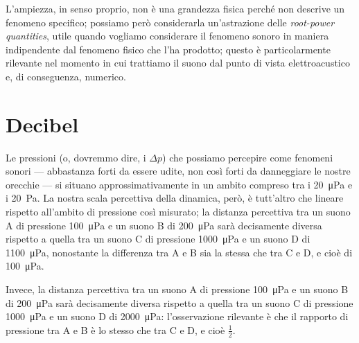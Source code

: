 \documentclass[11pt]{report}
\begin{document}
L'ampiezza, in senso proprio, non è una grandezza fisica perché non descrive un fenomeno specifico; possiamo però considerarla un'astrazione delle \emph{root-power quantities}, utile quando vogliamo considerare il fenomeno sonoro in maniera indipendente dal fenomeno fisico che l'ha prodotto; questo è particolarmente rilevante nel momento in cui trattiamo il suono dal punto di vista elettroacustico e, di conseguenza, numerico.



\section{Decibel}

Le pressioni (o, dovremmo dire, i $\Delta p$) che possiamo percepire come fenomeni sonori --- abbastanza forti da essere udite, non così forti da danneggiare le nostre orecchie --- si situano approssimativamente in un ambito compreso tra i \qty{20}{\micro\pascal} e i \qty{20}{\Pa}. La nostra scala percettiva della dinamica, però, è tutt'altro che lineare rispetto all'ambito di pressione così misurato; la distanza percettiva tra un suono A di pressione \qty{100}{\micro\pascal} e un suono B di \qty{200}{\micro\pascal} sarà decisamente diversa rispetto a quella tra un suono C di pressione \qty{1000}{\micro\pascal} e un suono D di \qty{1100}{\micro\pascal}, nonostante la differenza tra A e B sia la stessa che tra C e D, e cioè di \qty{100}{\micro\pascal}.

Invece, la distanza percettiva tra un suono A di pressione \qty{100}{\micro\pascal} e un suono B di \qty{200}{\micro\pascal} sarà decisamente diversa rispetto a quella tra un suono C di pressione \qty{1000}{\micro\pascal} e un suono D di \qty{2000}{\micro\pascal}: l'osservazione rilevante è che il rapporto di pressione tra A e B è lo stesso che tra C e D, e cioè $\frac{1}{2}$. 
\end{document}
